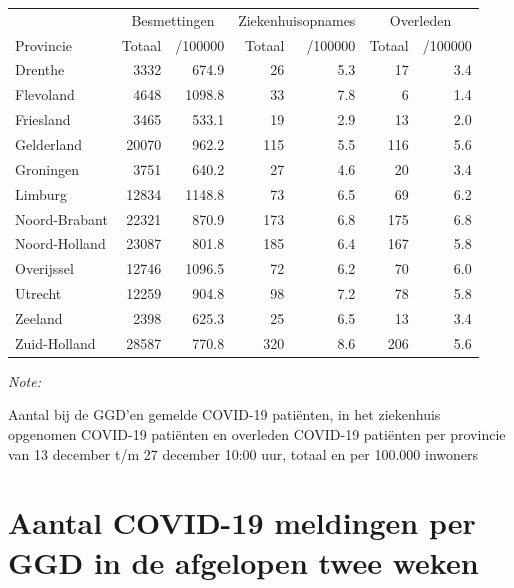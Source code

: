 \documentclass[
  english,
  man,floatsintext]{apa6}
\begin{document}
\begin{table}[H]
\centering
\begin{threeparttable}
\begin{tabular}{lrrrrrr}
\toprule
\multicolumn{1}{c}{ } & \multicolumn{2}{c}{Besmettingen} & \multicolumn{2}{c}{Ziekenhuisopnames} & \multicolumn{2}{c}{Overleden} \\
\cmidrule(l{3pt}r{3pt}){2-3} \cmidrule(l{3pt}r{3pt}){4-5} \cmidrule(l{3pt}r{3pt}){6-7}
Provincie & Totaal & /100000 & Totaal & /100000 & Totaal & /100000\\
\midrule
Drenthe & 3332 & 674.9 & 26 & 5.3 & 17 & 3.4\\
Flevoland & 4648 & 1098.8 & 33 & 7.8 & 6 & 1.4\\
Friesland & 3465 & 533.1 & 19 & 2.9 & 13 & 2.0\\
Gelderland & 20070 & 962.2 & 115 & 5.5 & 116 & 5.6\\
Groningen & 3751 & 640.2 & 27 & 4.6 & 20 & 3.4\\
Limburg & 12834 & 1148.8 & 73 & 6.5 & 69 & 6.2\\
Noord-Brabant & 22321 & 870.9 & 173 & 6.8 & 175 & 6.8\\
Noord-Holland & 23087 & 801.8 & 185 & 6.4 & 167 & 5.8\\
Overijssel & 12746 & 1096.5 & 72 & 6.2 & 70 & 6.0\\
Utrecht & 12259 & 904.8 & 98 & 7.2 & 78 & 5.8\\
Zeeland & 2398 & 625.3 & 25 & 6.5 & 13 & 3.4\\
Zuid-Holland & 28587 & 770.8 & 320 & 8.6 & 206 & 5.6\\
\bottomrule
\end{tabular}
\begin{tablenotes}
\item \textit{Note: } 
\item Aantal bij de GGD’en gemelde COVID-19 patiënten, in het ziekenhuis opgenomen COVID-19 patiënten en overleden COVID-19 patiënten per provincie van 13 december t/m 27 december 10:00 uur, totaal en per 100.000 inwoners
\end{tablenotes}
\end{threeparttable}
\end{table}

\newpage

\hypertarget{aantal-covid-19-meldingen-per-ggd-in-de-afgelopen-twee-weken}{%
\section{Aantal COVID-19 meldingen per GGD in de afgelopen twee weken}\label{aantal-covid-19-meldingen-per-ggd-in-de-afgelopen-twee-weken}}
\end{document}
